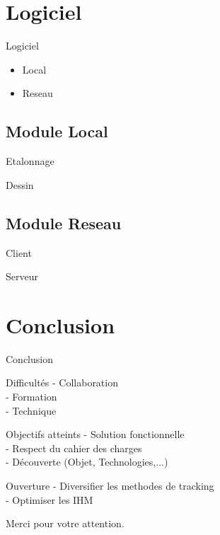 \documentclass{beamer}
\begin{document}
	
	\section{Logiciel}
		\begin{frame}{Logiciel}
			\begin{itemize}
			\item Local
			\item Reseau
			\end{itemize}
			
		\end{frame}
		
	\subsection{Module Local}
		\begin{frame}{Etalonnage}
		\end{frame}
		\begin{frame}{Dessin}
		\end{frame}

	\subsection{Module Reseau}
		\begin{frame}{Client}
		\end{frame}
		\begin{frame}{Serveur}
		\end{frame}

	\section{Conclusion}
		\begin{frame}{Conclusion}
			\begin{alertblock}{Difficultés}
				- Collaboration \\
				- Formation \\
				- Technique 
			\end{alertblock}
			\pause
			\begin{exampleblock}{Objectifs atteints}
				- Solution fonctionnelle \\
				- Respect du cahier des charges \\
				- Découverte (Objet, Technologies,...) 
			\end{exampleblock}
			\pause
			\begin{block}{Ouverture}
				- Diversifier les methodes de tracking\\
				- Optimiser les IHM \\
			\end{block}
		\end{frame}
	
	\begin{frame}
		\begin{center}
			\huge{Merci pour votre attention.} \\
		\end{center}
	\end{frame}
\end{document}

